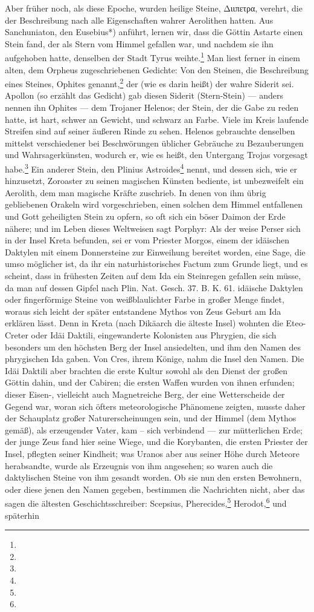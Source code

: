 \documentclass[a4paper, 11pt, oneside, polutonikogreek, german]{article}
\begin{document}
Aber früher noch, als diese Epoche, wurden heilige Steine, Διιπετρα, verehrt, die der Beschreibung nach alle Eigenschaften wahrer Aerolithen hatten. Aus Sanchuniaton, den Eusebius*) anführt, lernen wir, dass die Göttin Astarte einen Stein fand, der als Stern vom Himmel gefallen war, und nachdem sie ihn aufgehoben hatte, denselben der Stadt Tyrus weihte.\footnote{} Man liest ferner in einem alten, dem Orpheus zugeschriebenen Gedichte: Von den Steinen, die Beschreibung eines Steines, Ophites genannt,\footnote{} der (wie es darin heißt) der wahre Siderit sei. Apollon (so erzählt das Gedicht) gab diesen Siderit (Stern-Stein) --- anders nennen ihn Ophites --- dem Trojaner Helenos; der Stein, der die Gabe zu reden hatte, ist hart, schwer an Gewicht, und schwarz an Farbe. Viele im Kreis laufende Streifen sind auf seiner äußeren Rinde zu sehen. Helenos gebrauchte denselben mittelst verschiedener bei Beschwörungen üblicher Gebräuche zu Bezauberungen und Wahrsagerkünsten, wodurch er, wie es heißt, den Untergang Trojas vorgesagt habe.\footnote{} Ein anderer Stein, den Plinius Astroides\footnote{} nennt, und dessen sich, wie er hinzusetzt, Zoroaster zu seinen magischen Künsten bediente, ist unbezweifelt ein Aerolith, dem man magische Kräfte zuschrieb. In denen von ihm übrig gebliebenen Orakeln wird vorgeschrieben, einen solchen dem Himmel entfallenen und Gott geheiligten Stein zu opfern, so oft sich ein böser Daimon der Erde nähere; und im Leben dieses Weltweisen sagt Porphyr: Als der weise Perser sich in der Insel Kreta befunden, sei er vom Priester Morgos, einem der idäischen Daktylen mit einem Donnersteine zur Einweihung bereitet worden, eine Sage, die umso möglicher ist, da ihr ein naturhistorisches Factum zum Grunde liegt, und es scheint, dass in frühesten Zeiten auf dem Ida ein Steinregen gefallen sein müsse, da man auf dessen Gipfel nach Plin. Nat. Gesch. 37. B. K. 61. idäische Daktylen oder fingerförmige Steine von weißblaulichter Farbe in großer Menge findet, woraus sich leicht der später entstandene Mythos von Zeus Geburt am Ida erklären lässt. Denn in Kreta (nach Dikäarch die älteste Insel) wohnten die Eteo-Creter oder Idäi Daktili, eingewanderte Kolonisten aus Phrygien, die sich besonders um den höchsten Berg der Insel ansiedelten, und ihm den Namen des phrygischen Ida gaben. Von Cres, ihrem Könige, nahm die Insel den Namen. Die Idäi Daktili aber brachten die erste Kultur sowohl als den Dienst der großen Göttin dahin, und der Cabiren; die ersten Waffen wurden von ihnen erfunden; dieser Eisen-, vielleicht auch Magnetreiche Berg, der eine Wetterscheide der Gegend war, woran sich öfters meteorologische Phänomene zeigten, musste daher der Schauplatz großer Naturerscheinungen sein, und der Himmel (dem Mythos gemäß), als erzeugender Vater, kam -- sich verbindend --- zur mütterlichen Erde; der junge Zeus fand hier seine Wiege, und die Korybanten, die ersten Priester der Insel, pflegten seiner Kindheit; was Uranos aber aus seiner Höhe durch Meteore herabsandte, wurde als Erzeugnis von ihm angesehen; so waren auch die daktylischen Steine von ihm gesandt worden. Ob sie nun den ersten Bewohnern, oder diese jenen den Namen gegeben, bestimmen die Nachrichten nicht, aber das sagen die ältesten Geschichtsschreiber: Scepsius, Pherecides,\footnote{} Herodot,\footnote{} und späterhin 
\end{document}
